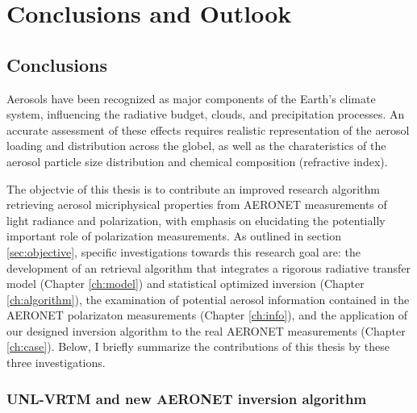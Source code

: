 \chapter{Conclusions and Outlook} \label{ch:summary}

\section{Conclusions}

Aerosols have been recognized as major components of the Earth's climate 
system, influencing the radiative budget, clouds, and precipitation processes.
An accurate assessment of these effects requires realistic representation of
the aerosol loading and distribution across the globel, as well as the
charateristics of the aerosol particle size distribution and 
chemical composition (refractive index). 

The objectvie of this thesis is to
contribute an improved research algorithm retrieving aerosol micriphysical
properties from AERONET measurements of light radiance and polarization, with
emphasis on elucidating the potentially important role of polarization
measurements. As outlined in section \ref{sec:objective}, specific 
investigations towards this research goal are: the development of an retrieval
algorithm that integrates a rigorous radiative transfer model 
(Chapter \ref{ch:model}) and statistical optimized inversion
(Chapter \ref{ch:algorithm}), the examination
of potential aerosol information contained in the AERONET polarizaton
measurements (Chapter \ref{ch:info}), and the application of our designed
inversion algorithm to the real AERONET measurements (Chapter \ref{ch:case}).
Below, I briefly summarize the contributions of this thesis by these three
investigations.
 
\subsection{UNL-VRTM and new AERONET inversion algorithm}

